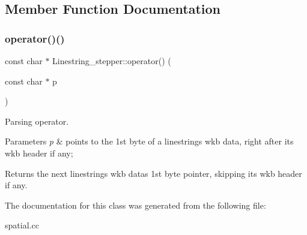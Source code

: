\subsection{Member Function Documentation}
\mbox{\label{classLinestring__stepper_ac9d6663371fe790dce1b5b2280c6e419}} 
\subsubsection{\texorpdfstring{operator()()}{operator()()}}
{\footnotesize\ttfamily const char $\ast$ Linestring\+\_\+stepper\+::operator() (\begin{DoxyParamCaption}\item[{const char $\ast$}]{p }\end{DoxyParamCaption})}

Parsing operator. 
\begin{DoxyParams}{Parameters}
{\em p} & points to the 1st byte of a linestring\textquotesingle{}s wkb data, right after its wkb header if any; \\
\hline
\end{DoxyParams}
\begin{DoxyReturn}{Returns}
the next linestring\textquotesingle{}s wkb data\textquotesingle{}s 1st byte pointer, skipping its wkb header if any. 
\end{DoxyReturn}


The documentation for this class was generated from the following file\+:\begin{DoxyCompactItemize}
\item 
spatial.\+cc\end{DoxyCompactItemize}
